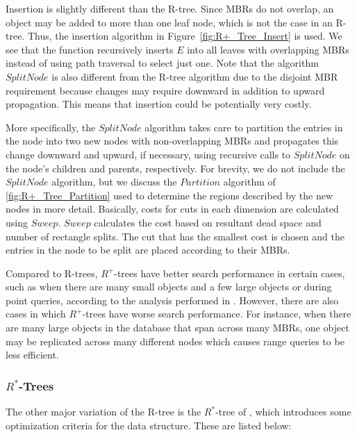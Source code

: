 Insertion is slightly different than the R-tree. Since MBRs do not overlap, an
object may be added to more than one leaf node, which is not the case in an R-tree. 
Thus, the insertion algorithm in Figure~\ref{fig:R+_Tree_Insert} is used. We see that
the function recursively inserts $E$ into all leaves with overlapping MBRs instead of 
using path traversal to select just one. Note that the algorithm $SplitNode$ is 
also different from the R-tree algorithm due to the disjoint MBR requirement because
changes may require downward in addition to upward propagation. This means that insertion
could be potentially very costly.

More specifically, the $SplitNode$ algorithm takes care to partition the entries in 
the node into two new nodes with non-overlapping MBRs and propagates this change 
downward and upward, if necessary, using recursive calls to $SplitNode$ on the node's
children and parents, respectively. For brevity, we do not include the $SplitNode$ 
algorithm, but we discuss the $Partition$ algorithm of \ref{fig:R+_Tree_Partition} 
used to determine the regions described by the new nodes in more detail. Basically, 
costs for cuts in each dimension are calculated using $Sweep$. $Sweep$ calculates the
cost based on resultant dead space and number of rectangle splits. The cut that has 
the smallest cost is chosen and the entries in the node to be split are placed 
according to their MBRs. 

Compared to R-trees, $R^{+}$-trees have better search performance in certain cases,
such as when there are many small objects and a few large objects or during point 
queries, according to the analysis performed in \cite{DBLP:conf/vldb/SellisRF87}. 
However, there are also cases in which $R^{+}$-trees have worse search performance. 
For instance, when there are many large objects in the database that span across many
MBRs, one object may be replicated across many different nodes which causes range
queries to be less efficient.





\subsubsection{$R^{*}$-Trees}
The other major variation of the R-tree is the $R^{*}$-tree of \cite{Beckmann:1990:RER:93597.98741}, which introduces 
some optimization criteria for the data structure. These are listed below:

